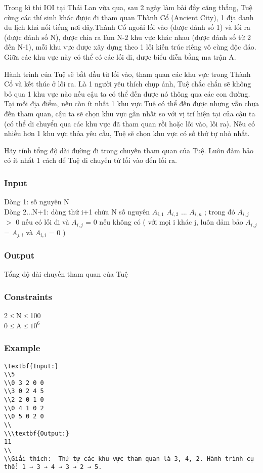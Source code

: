 



   Trong kì thi IOI tại Thái Lan vừa qua, sau 2 ngày làm bài đầy căng thẳng, Tuệ cùng các thí sinh khác được đi tham quan Thành Cổ (Ancient City), 1 địa danh du lịch khá nổi tiếng nơi đây.Thành Cổ ngoài lối vào (được đánh số 1) và lối ra (được đánh số N), được chia ra làm N-2 khu vực khác nhau (được đánh số từ 2 đến N-1), mỗi khu vực được xây dựng theo 1 lối kiến trúc riêng vô cùng độc đáo. Giữa các khu vực này có thể có các lối đi, được biểu diễn bằng ma trận A.  

   Hành trình của Tuệ sẽ bắt đầu từ lối vào, tham quan các khu vực trong Thành Cổ và kết thúc ở lối ra. Là 1 người yêu thích chụp ảnh, Tuệ chắc chắn sẽ không bỏ qua 1 khu vực nào nếu cậu ta có thể đến được nó thông qua các con đường. Tại mỗi địa điểm, nếu còn ít nhất 1 khu vực Tuệ có thể đến được nhưng vẫn chưa đến tham quan, cậu ta sẽ chọn khu vực gần nhất so với vị trí hiện tại của cậu ta (có thể di chuyển qua các khu vực đã tham quan rồi hoặc lối vào, lối ra). Nếu có nhiều hơn 1 khu vực thỏa yêu cầu, Tuệ sẽ chọn khu vực có số thứ tự nhỏ nhất.  

   Hãy tính tổng độ dài đường đi trong chuyến tham quan của Tuệ. Luôn đảm bảo có ít nhất 1 cách để Tuệ di chuyển từ lối vào đến lối ra.  

\subsubsection{   Input  }

   Dòng 1: số nguyên N   
\\   Dòng 2...N+1: dòng thứ i+1 chứa N số nguyên $A_{i,1}$   $A_{i,2}$   ... $A_{i,n}$   ; trong đó $A_{i,j}$   $>$ 0 nếu có lối đi và $A_{i,j}$   = 0 nếu không có ( với mọi i khác j, luôn đảm bảo $A_{i,j}$   = $A_{j,i}$   và $A_{i,i}$   = 0 )  

\subsubsection{   Output  }

   Tổng độ dài chuyến tham quan của Tuệ  

\subsubsection{   Constraints  }

   2 ≤ N ≤ 100   
\\   0 ≤ A ≤ $10^{6}$

\subsubsection{   Example  }
\begin{verbatim}
\textbf{Input:}
\\5
\\0 3 2 0 0
\\3 0 2 4 5
\\2 2 0 1 0
\\0 4 1 0 2
\\0 5 0 2 0
\\
\\\textbf{Output:}
11
\\
\\Giải thích:  Thứ tự các khu vực tham quan là 3, 4, 2. Hành trình cụ thể: 1 → 3 → 4 → 3 → 2 → 5.\end{verbatim}
